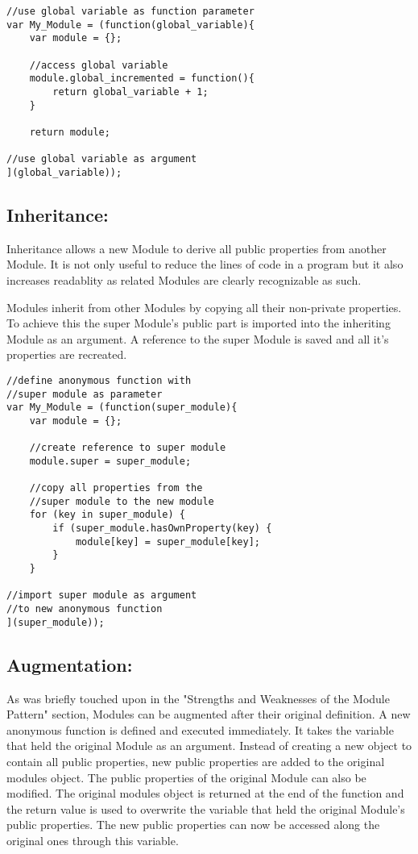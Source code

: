 \documentclass{bioinfo}
\begin{document}
\begin{lstlisting}
//use global variable as function parameter
var My_Module = (function(global_variable){
	var module = {};
	
	//access global variable
	module.global_incremented = function(){
		return global_variable + 1;
	}
	
	return module;	
	
//use global variable as argument
](global_variable));
\end{lstlisting}

\subsection{Inheritance:}

Inheritance allows a new Module to derive all public properties from another Module. It is not only useful to reduce the lines of code in a program but it also increases readablity as related Modules are clearly recognizable as such.\vspace{\baselineskip}


Modules inherit from other Modules by copying all their non-private properties. To achieve this the super Module's public part is imported into the inheriting Module as an argument. A reference to the super Module is saved and all it's properties are recreated.\vspace{\baselineskip}

\begin{lstlisting}
//define anonymous function with
//super module as parameter
var My_Module = (function(super_module){
	var module = {};
	
	//create reference to super module
	module.super = super_module;
	
	//copy all properties from the 
	//super module to the new module
	for (key in super_module) {
		if (super_module.hasOwnProperty(key) {
			module[key] = super_module[key];
		}
	}
	
//import super module as argument
//to new anonymous function
](super_module));
\end{lstlisting}


\subsection{Augmentation:}
As was briefly touched upon in the "Strengths and Weaknesses of the Module Pattern" section, Modules can be augmented after their original definition. A new anonymous function is defined and executed immediately. It takes the variable that held the original Module as an argument. Instead of creating a new object to contain all public properties, new public properties are added to the original modules object. The public properties of the original Module can also be modified. The original modules object is returned at the end of the function and the return value is used to overwrite the variable that held the original Module's public properties. The new public properties can now be accessed along the original ones through this variable. \\
\end{document}
